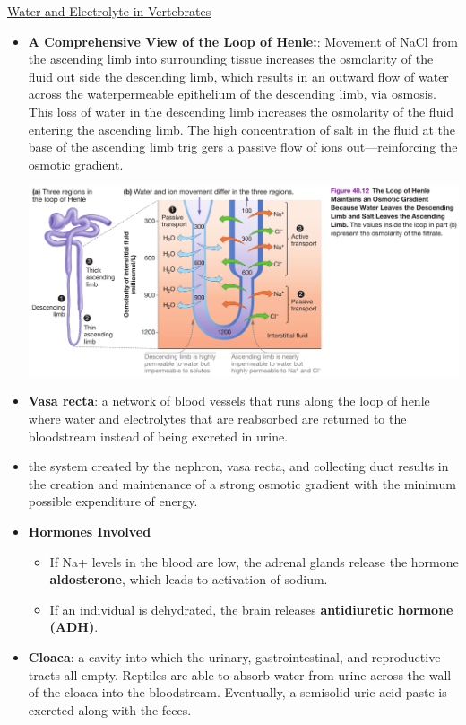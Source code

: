\documentclass[12pt,letterpaper]{article}
\begin{document}
\begin{secbox}{\hyperlink{40}{Water and Electrolyte in Vertebrates}}
{\begin{itemize}
        \item \textbf{A Comprehensive View of the Loop of Henle:}: Movement of NaCl from the ascending limb into surrounding tissue increases the osmolarity of the fluid out­ side the descending limb, which results in an outward flow of water across the water­permeable epithelium of the descending limb, via osmosis. This loss of water in the descending limb increases the osmolarity of the fluid entering the ascending limb. The high concentration of salt in the fluid at the base of the ascending limb trig­ gers a passive flow of ions out—reinforcing the osmotic gradient.\par
        \includegraphics[width=\linewidth]{images/loop-of-henle.png}
        \item \textbf{Vasa recta}: a network of blood vessels that runs along the loop of henle where water and electrolytes that are reabsorbed are returned to the bloodstream instead of being excreted in urine.
        \item the system created by the nephron, vasa recta, and collecting duct results in the creation and maintenance of a strong osmotic gradient with the minimum possible expenditure of energy.
        \item \textbf{Hormones Involved}
            \begin{itemize}
                \item If Na+ levels in the blood are low, the adrenal glands release the hormone \textbf{aldosterone}, which leads to activation of sodium.
                \item  If an individual is dehydrated, the brain releases \textbf{antidiuretic hormone (ADH)}.
            \end{itemize}
        \item \textbf{Cloaca}: a cavity into which the urinary, gastrointestinal, and reproductive tracts all empty. Reptiles are able to absorb water from urine across the wall of the cloaca into the bloodstream. Eventually, a semisolid uric acid paste is excreted along with the feces.
    \end{itemize}


}
\end{secbox}
\end{document}
